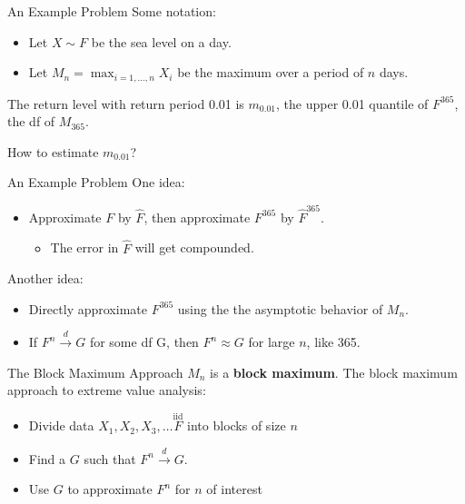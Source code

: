 \documentclass{beamer}
\begin{document}
\begin{frame}{An Example Problem}
    Some notation:
    \begin{itemize}
        \item Let $X \sim F$ be the sea level on a day.
        \item Let $M_n = \max_{i = 1, \ldots, n} X_i$ be the maximum over a period of $n$ days.
    \end{itemize}
    The return level with return period 0.01 is $m_{0.01}$, the upper 0.01 quantile of $F^{365}$, the df of $M_{365}$.

    \bigskip

    How to estimate $m_{0.01}$?
\end{frame}

\begin{frame}{An Example Problem}
    One idea:
    \begin{itemize}
        \item Approximate $F$ by $\hat{F}$, then approximate $F^{365}$ by $\hat{F}^{365}$.
        \begin{itemize}
            \item The error in $\hat{F}$ will get compounded.
        \end{itemize}
    \end{itemize}

    Another idea:
    \begin{itemize}
        \item Directly approximate $F^{365}$ using the the asymptotic behavior of $M_n$.
        \item If $F^n \xrightarrow{d} G$ for some df G, then $F^n \approx G$ for large $n$, like 365.
    \end{itemize}
\end{frame}

\begin{frame}{The Block Maximum Approach}
    $M_n$ is a \textbf{block maximum}. The block maximum approach to extreme value analysis:
    \begin{itemize}
        \item Divide data $X_1, X_2, X_3, \ldots \overset{\text{iid}} F$ into blocks of size $n$
        \item Find a $G$ such that $F^n \xrightarrow{d} G$.
        \item Use $G$ to approximate $F^n$ for $n$ of interest
    \end{itemize}
\end{frame}
\end{document}
